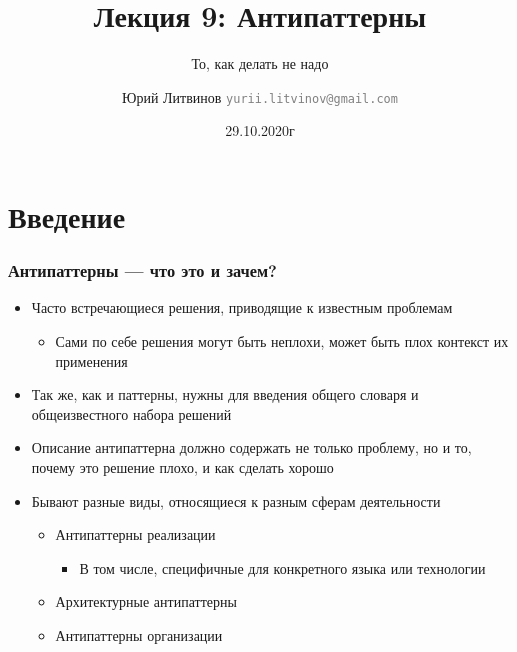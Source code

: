 \documentclass[xetex,mathserif,serif]{beamer}
\title{Лекция 9: Антипаттерны}
\subtitle{То, как делать не надо}
\author[Юрий Литвинов]{Юрий Литвинов \newline \textcolor{gray}{\small\texttt{yurii.litvinov@gmail.com}}}
\date{29.10.2020г}
\begin{document}
	
	\frame{\titlepage}

	\section{Введение}

	\begin{frame}
		\frametitle{Антипаттерны --- что это и зачем?}
		\begin{itemize}
			\item Часто встречающиеся решения, приводящие к известным проблемам
			\begin{itemize}
				\item Сами по себе решения могут быть неплохи, может быть плох контекст их применения
			\end{itemize}
			\item Так же, как и паттерны, нужны для введения общего словаря и общеизвестного набора решений
			\item Описание антипаттерна должно содержать не только проблему, но и то, почему это решение плохо, и как сделать хорошо
			\item Бывают разные виды, относящиеся к разным сферам деятельности
			\begin{itemize}
				\item Антипаттерны реализации
				\begin{itemize}
					\item В том числе, специфичные для конкретного языка или технологии
				\end{itemize}
				\item Архитектурные антипаттерны
				\item Антипаттерны организации
			\end{itemize}
		\end{itemize}
	\end{frame}
\end{document}

